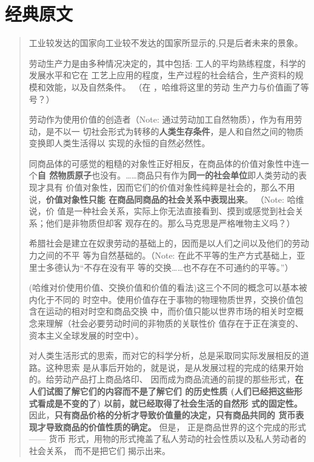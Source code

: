 \chapter{经典原文}

\begin{quotation}工业较发达的国家向工业较不发达的国家所显示的,只是后者未来的景象。

  
劳动生产力是由多种情况决定的，其中包括: 工人的平均熟练程度，科学的发展水平和它在
工艺上应用的程度，生产过程的社会结合，生产资料的规模和效能，以及自然条件。
 （在 ，哈维将这里的劳动
生产力与价值画了等号？）

  劳动作为使用价值的创造者（Note: 通过劳动加工自然物质），作为有用劳动，是不以一
切社会形式为转移的\textbf{人类生存条件}，是人和自然之间的物质变换即人类生活得以
实现的永恒的自然必然性。

  同商品体的可感觉的粗糙的对象性正好相反，在商品体的价值对象性中连一个\textbf{自
然物质原子}也没有。……商品只有作为\textbf{同一的社会单位}即人类劳动的表现才具有
价值对象性，因而它们的价值对象性纯粹是社会的，那么不用说，\textbf{价值对象性只能
在商品同商品的社会关系中表现出来}。 （Note: 哈维说，价
值是一种社会关系，实际上你无法直接看到、摸到或感觉到社会关系；他们是非物质但却客
观存在的。那么马克思是严格唯物主义吗？）

  希腊社会是建立在奴隶劳动的基础上的，因而是以人们之间以及他们的劳动力之间的不平
等为自然基础的。（Note: 在此不平等的生产方式基础上，亚里士多德认为“不存在没有平
等的交换……也不存在不可通约的平等。”）

  (哈维对价使用价值、交换价值和价值的看法)这三个不同的概念可以基本被内化于不同的
时空中。使用价值存在于事物的物理物质世界，交换价值包含在运动的相对时空和商品交换
中，而价值只能以世界市场的相关时空概念来理解（社会必要劳动时间的非物质的关联性价
值存在于正在演变的、资本主义全球发展的时空中）。

  对人类生活形式的思索，而对它的科学分析，总是采取同实际发展相反的道路。这种思索
是从事后开始的，就是说，是从发展过程的完成的结果开始的。给劳动产品打上商品烙印、
因而成为商品流通的前提的那些形式，\textbf{在人们试图了解它们的内容而不是了解它们
的历史性质 (人们已经把这些形式看成是不变的了) 以前，就已经取得了社会生活的自然形
式的固定性。}因此，\textbf{只有商品价格的分析才导致价值量的决定，只有商品共同的
货币表现才导致商品的价值性质的确定。} 但是， 正是商品世界的这个完成的形式—— 货币
形式，用物的形式掩盖了私人劳动的社会性质以及私人劳动者的社会关系， 而不是把它们
揭示出来。


\end{quotation}
